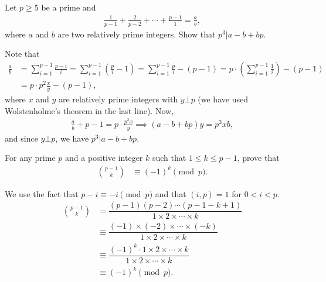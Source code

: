 \documentclass[12pt]{subfile}
\begin{document}
		\begin{problem}
			Let $p \geq 5$ be a prime and
			\begin{align*}
			\frac{1}{p-1} + \frac{2}{p-2} + \cdots + \frac{p-1}{1}=\frac{a}{b},
			\end{align*}
			where $a$ and $b$ are two relatively prime integers. Show that $p^3 | a-b+bp$.
		\end{problem}
		
		\begin{solution}
			Note that
				\begin{align*}
					\frac{a}{b} &= \sum_{i=1}^{p-1} \frac{p-i}{i} =\sum_{i=1}^{p-1} \left(\frac{p}{i} -1 \right)=\sum_{i=1}^{p-1} \frac{p}{i} - (p-1) =p\cdot\left(\sum_{i=1}^{p-1} \frac{1}{i}\right) - (p-1)\\
					&=p \cdot p^2 \frac{x}{y} - (p-1),
				\end{align*}
			where $x$ and $y$ are relatively prime integers with $y \bot p$ (we have used Wolstenholme's theorem in the last line). Now,
				\begin{align*}
					\frac a b+p-1=p\cdot\frac{p^2x}y \implies (a-b+bp)y=p^3xb,
				\end{align*}
			and since $y\bot p$, we have $p^3 | a-b+bp$.
			
		\end{solution}
	


		\begin{problem}\label{prob:binom(p-1)(k)}
			For any prime $p$ and a positive integer $k$ such that $1 \leq k \leq p-1$, prove that
				\begin{align*}
					\binom{p-1}{k} & \equiv(-1)^k\pmod p.
				\end{align*}
		\end{problem}
		
		\begin{solution}
			We use the fact that $p-i\equiv-i\pmod p$ and that $(i,p)=1$ for $0<i<p$.
				\begin{align*}
					\binom{p-1}{k} & = \dfrac{(p-1)(p-2)\cdots(p-1-k+1)}{1\times 2 \times \cdots \times k}\\
					& \equiv \dfrac{(-1) \times (-2) \times \cdots \times (-k)}{1\times 2 \times \cdots \times k}\\
					& \equiv\dfrac{(-1)^k \cdot 1\times 2 \times \cdots \times k}{1\times 2 \times \cdots \times k}\\
					& \equiv(-1)^k\pmod p.
				\end{align*}
			
		\end{solution}
			
\end{document}
